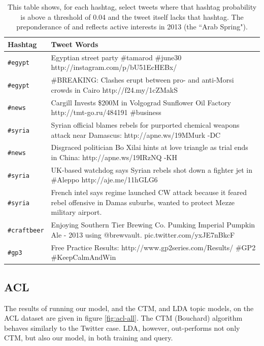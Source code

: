 \begin{table}
    \centering
    \begin{tabular}{| l || p{9cm} | } \hline 
        \bf{Hashtag} & %
        \bf{Tweet Words} \\ \hline
{\small \tt \#egypt} & 	{\small Egyptian street party \#tamarod \#june30 http://instagram.com/p/bU51EcHEBx/} \\ \hline
{\small \tt \#egypt} & 	{\small \#BREAKING: Clashes erupt between pro- and anti-Morsi crowds in Cairo http://f24.my/1cZMakS} \\ \hline
{\small \tt \#news} &     {\small Cargill Invests \$200M in Volgograd Sunflower Oil Factory http://tmt-go.ru/484191 \#business} \\ \hline
{\small \tt \#syria} & 	{\small Syrian official blames rebels for purported chemical weapons attack near Damascus: http://apne.ws/19MMurk -DC} \\ \hline
{\small \tt \#news} & 	{\small Disgraced politician Bo Xilai hints at love triangle as trial ends in China: http://apne.ws/19IRzNQ -KH} \\ \hline
{\small \tt \#syria} & 	{\small UK-based watchdog says Syrian rebels shot down a fighter jet in \#Aleppo http://aje.me/11hGLG6} \\ \hline
{\small \tt \#syria} & 	{\small French intel says regime launched CW attack because it feared rebel offensive in Damas suburbs, wanted to protect Mezze military airport.} \\ \hline
{\small \tt \#craftbeer} & 	{\small Enjoying Southern Tier Brewing Co. Pumking Imperial Pumpkin Ale - 2013 using @brewvault. pic.twitter.com/yxJE7nBkcF} \\ \hline
{\small \tt \#gp3} & 	{\small Free Practice Results: http://www.gp2series.com/Results/ \#GP2 \#KeepCalmAndWin} \\ \hline
    \end{tabular}
    \caption{This table shows, for each hashtag, select tweets where that hashtag probability is above a threshold of 0.04 and the tweet itself lacks that hashtag. The preponderance of  and  reflects active interests in 2013 (the ``Arab Spring").  }
    \label{tbl:generative}
\end{table}


\subsection*{ACL}
The results of running our model, and the CTM, and LDA topic models, on the ACL dataset are given in figure \ref{fig:acl-all}. The CTM (Bouchard) algorithm behaves similarly to the Twitter case. LDA, however, out-performs not only CTM, but also our model, in both training and query.

